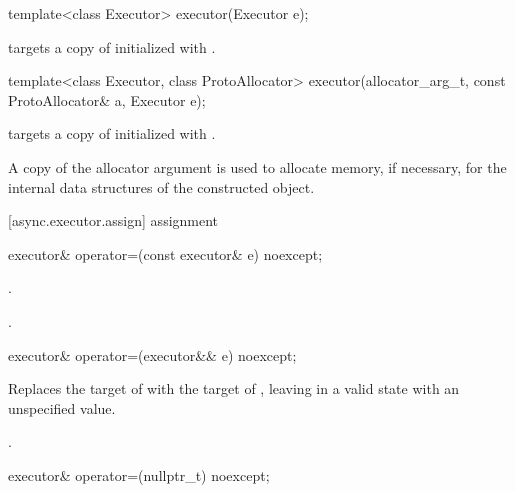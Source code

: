 %
\begin{itemdecl}
template<class Executor> executor(Executor e);
\end{itemdecl}

\begin{itemdescr}
\pnum
\effects {} targets a copy of  initialized with .
\end{itemdescr}

%
\begin{itemdecl}
template<class Executor, class ProtoAllocator>
  executor(allocator_arg_t, const ProtoAllocator& a, Executor e);
\end{itemdecl}

\begin{itemdescr}
\pnum
\effects {} targets a copy of  initialized with .

\pnum
A copy of the allocator argument is used to allocate memory, if necessary, for the internal data structures of the constructed  object.
\end{itemdescr}



[async.executor.assign]{ assignment}

%
\begin{itemdecl}
executor& operator=(const executor& e) noexcept;
\end{itemdecl}

\begin{itemdescr}
\pnum
\effects {}.

\pnum
\returns {}.
\end{itemdescr}

%
\begin{itemdecl}
executor& operator=(executor&& e) noexcept;
\end{itemdecl}

\begin{itemdescr}
\pnum
\effects Replaces the target of  with the target of , leaving  in a valid state with an unspecified value.

\pnum
\returns {}.
\end{itemdescr}

%
\begin{itemdecl}
executor& operator=(nullptr_t) noexcept;
\end{itemdecl}

